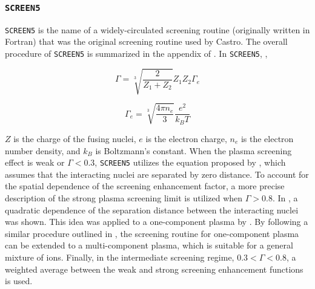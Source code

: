 \documentclass[preprint,times,tighten,linenumbers,trackchanges]{aastex631}
\newcommand{\castro}{{\sf Castro}}
\begin{document}


\subsubsection{{\tt SCREEN5}}

{\tt SCREEN5} is the name of a widely-circulated screening routine (originally written in Fortran) that was the original screening routine used by \castro.
The overall procedure of {\tt SCREEN5} is summarized in the appendix of \cite{Wallace:1982}. In {\tt SCREEN5}, , 

\begin{equation}\label{Eq:gamma_eq}
    \Gamma = \sqrt[3]{\frac{2}{Z_1+Z_2}}Z_1 Z_2 \Gamma_e
\end{equation}


\begin{equation}\label{Eq:gamma_e_eq}
    \Gamma_e = \sqrt[3]{\frac{4\pi n_e}{3}}\frac{e^2}{k_BT}
\end{equation}

$Z$ is the charge of the fusing nuclei, $e$ is the electron charge, $n_e$ is the electron number density, and $k_B$ is Boltzmann's constant. When the plasma screening effect is weak or $\Gamma < 0.3$, {\tt SCREEN5} utilizes the equation proposed by \cite{Graboske_1973, Dewitt_1973}, which assumes that the interacting nuclei are separated by zero distance. To account for the spatial dependence of the screening enhancement factor, a more precise description of the strong plasma screening limit is utilized when $\Gamma > 0.8$. In \cite{jancovici:1977}, a quadratic dependence of the separation distance between the interacting nuclei was shown. This idea was applied to a one-component plasma by \cite{alastuey:1978}. By following a similar procedure outlined in \cite{itoh:1979}, the screening routine for one-component plasma can be extended to a multi-component plasma, which is suitable for a general mixture of ions. Finally, in
the intermediate screening regime, $0.3 < \Gamma < 0.8$, a weighted average between the weak and strong screening enhancement functions is used.
\end{document}
